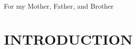 \documentclass[fullpage, hidelinks]{uiucthesis2009}
\begin{document}

\begin{dedication}
For my Mother, Father, and Brother
\end{dedication}


%


%
%
%
\tableofcontents
%
%
%
%

\mainmatter

\chapter{INTRODUCTION}
\label{sec:theory}

\clearpage
\end{document}
